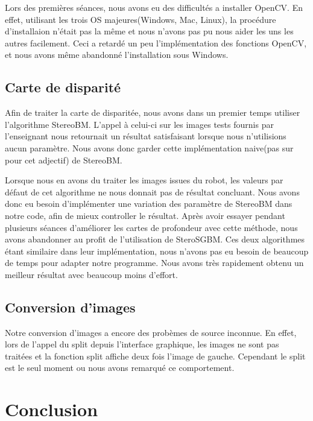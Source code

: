 \documentclass[a4paper]{article}
\begin{document}
Lors des premières séances, nous avons eu des difficultés a installer OpenCV. En effet, utilisant les trois OS majeures(Windows, Mac, Linux), la procédure d'installaion n'était pas la même et nous n'avons pas pu nous aider les uns les autres facilement. Ceci a retardé un peu l'implémentation des fonctions OpenCV, et nous avons même abandonné l'installation sous Windows.

\subsection*{Carte de disparité}

Afin de traiter la carte de disparitée, nous avons dans un premier temps utiliser l'algorithme StereoBM. L'appel à celui-ci sur les images tests fournis par l'enseignant nous retournait un résultat satisfaisant lorsque nous n'utilisions aucun paramètre. Nous avons donc garder cette implémentation naive(pas sur pour cet adjectif) de StereoBM.

Lorsque nous en avons du traiter les images issues du robot, les valeurs par défaut de cet algorithme ne nous donnait pas de résultat concluant. Nous avons donc eu besoin d'implémenter une variation des paramètre de StereoBM dans notre code, afin de mieux controller le résultat. Après avoir essayer pendant plusieurs séances d'améliorer les cartes de profondeur avec cette méthode, nous avons abandonner au profit de l'utilisation de SteroSGBM. Ces deux algorithmes étant similaire dans leur implémentation, nous n'avons pas eu besoin de beaucoup de temps pour adapter notre programme. Nous avons très rapidement obtenu un meilleur résultat avec beaucoup moins d'effort.

\subsection*{Conversion d'images}

Notre conversion d'images a encore des probèmes de source inconnue. En effet, lors de l'appel du split depuis l'interface graphique, les images ne sont pas traitées et la fonction split affiche deux fois l'image de gauche. Cependant le split est le seul moment ou nous avons remarqué ce comportement.


\section{Conclusion}
\end{document}
